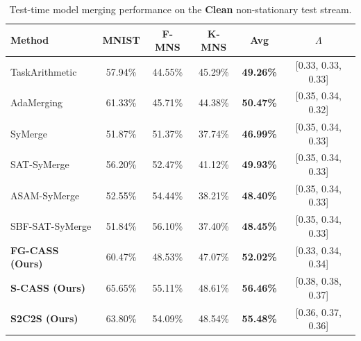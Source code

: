 \documentclass{article}
\theoremstyle{plain}
\theoremstyle{definition}
\theoremstyle{remark}
\begin{document}
\begin{table}[t]
\caption{Test-time model merging performance on the \textbf{Clean} non-stationary test stream.}
\label{tab:clean}
\vskip 0.15in
\begin{center}
\begin{small}
\begin{sc}
\setlength{\tabcolsep}{6pt}
\begin{tabular}{lccccc}
\toprule
Method & MNIST & F-MNS & K-MNS & Avg & $\Lambda$ \\
\midrule
TaskArithmetic & 57.94\% & 44.55\% & 45.29\% & \textbf{49.26\%} & [0.33, 0.33, 0.33] \\
AdaMerging & 61.33\% & 45.71\% & 44.38\% & \textbf{50.47\%} & [0.35, 0.34, 0.32] \\
SyMerge & 51.87\% & 51.37\% & 37.74\% & \textbf{46.99\%} & [0.35, 0.34, 0.33] \\
SAT-SyMerge & 56.20\% & 52.47\% & 41.12\% & \textbf{49.93\%} & [0.35, 0.34, 0.33] \\
ASAM-SyMerge & 52.55\% & 54.44\% & 38.21\% & \textbf{48.40\%} & [0.35, 0.34, 0.33] \\
SBF-SAT-SyMerge & 51.84\% & 56.10\% & 37.40\% & \textbf{48.45\%} & [0.35, 0.34, 0.33] \\
\textbf{FG-CASS (Ours)} & 60.47\% & 48.53\% & 47.07\% & \textbf{52.02\%} & [0.33, 0.34, 0.34] \\
\textbf{S-CASS (Ours)} & 65.65\% & 55.11\% & 48.61\% & \textbf{56.46\%} & [0.38, 0.38, 0.37] \\
\textbf{S2C2S (Ours)} & 63.80\% & 54.09\% & 48.54\% & \textbf{55.48\%} & [0.36, 0.37, 0.36] \\
\bottomrule
\end{tabular}
\end{sc}
\end{small}
\end{center}
\vskip -0.1in
\end{table}
\end{document}

